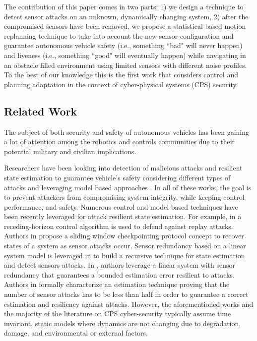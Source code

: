 The contribution of this paper comes in two parts: 1) we design a technique to detect sensor attacks on an unknown, dynamically changing system, 2) after the compromised sensors have been removed, we propose a statistical-based motion replanning technique to take into account the new sensor configuration and  guarantee autonomous vehicle safety (i.e., something ``bad" will never happen) and liveness (i.e., something ``good" will eventually happen) while navigating in an obstacle filled environment using limited sensors with different noise profiles. 
To the best of our knowledge this is the first work that considers control and planning adaptation in the context of cyber-physical systems (CPS) security.

\subsection{Related Work}
\label{sec:Related Work}

The subject of both security and safety of autonomous vehicles has been gaining a lot of attention among the robotics  and controls communities due to their potential military and civilian implications.

Researchers have been looking into detection of malicious attacks and resilient state estimation to guarantee vehicle's safety considering different types of attacks and leveraging model based approaches \cite{zhu2012resilient, fawzi2014secure, 6943080, 7330811}. In all of these works, the goal is to prevent attackers from compromising system integrity, while keeping control performance, and safety. Numerous control and model based techniques have been recently leveraged for attack resilient state estimation. For example, in \cite{zhu2012resilient} a receding-horizon control algorithm is used to defend against replay attacks. Authors in \cite{8443718} propose a sliding window checkpointing protocol concept to recover states of a system as sensor attacks occur. Sensor redundancy based on a linear system model is leveraged in \cite{6943080} to build a recursive technique for state estimation and detect sensors attacks. In \cite{7330811}, authors leverage a linear system with sensor redundancy that guarantees a bounded estimation error resilient to attacks. Authors in \cite{fawzi2014secure} formally characterize an estimation technique proving that the number of sensor attacks has to be less than half in order to guarantee a correct estimation and resiliency against attacks. However, the aforementioned works and the majority of the literature on CPS cyber-security typically assume time invariant, static models where dynamics are not changing due to degradation, damage, and environmental or external factors. 

